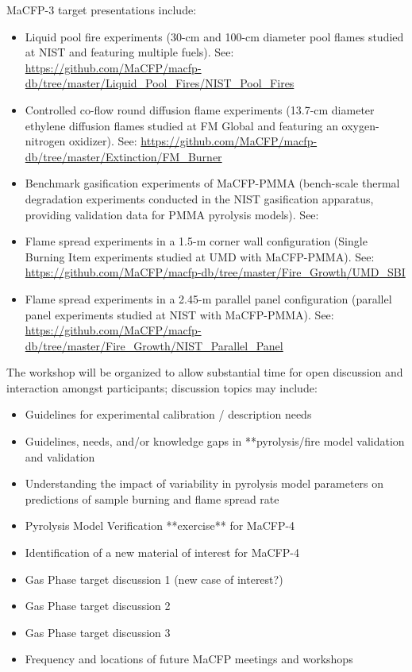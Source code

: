 \documentclass[12pt]{article}
\begin{document}
MaCFP-3 target presentations include:
\begin{itemize}[noitemsep]
\item Liquid pool fire experiments (30-cm and 100-cm diameter pool flames studied at NIST and featuring multiple fuels). See: \url{https://github.com/MaCFP/macfp-db/tree/master/Liquid_Pool_Fires/NIST_Pool_Fires}
\item Controlled co-flow round diffusion flame experiments (13.7-cm diameter ethylene diffusion flames studied at FM Global and featuring an oxygen-nitrogen oxidizer). See: \url{https://github.com/MaCFP/macfp-db/tree/master/Extinction/FM_Burner}
\item Benchmark gasification experiments of MaCFP-PMMA (bench-scale thermal degradation experiments conducted in the NIST gasification apparatus, providing validation data for PMMA pyrolysis models). See: %
\item Flame spread experiments in a 1.5-m corner wall configuration (Single Burning Item experiments studied at UMD with MaCFP-PMMA). See: \url{https://github.com/MaCFP/macfp-db/tree/master/Fire_Growth/UMD_SBI} 
\item Flame spread experiments in a 2.45-m parallel panel configuration (parallel panel experiments studied at NIST with MaCFP-PMMA). See: \url{https://github.com/MaCFP/macfp-db/tree/master/Fire_Growth/NIST_Parallel_Panel}
 \end{itemize}
 
\newpage
The workshop will be organized to allow substantial time for open discussion and interaction amongst participants; discussion topics may include:

\begin{itemize}[noitemsep]
\item Guidelines for experimental calibration / description needs
\item Guidelines, needs, and/or knowledge gaps in **pyrolysis/fire model validation and validation
\item Understanding the impact of variability in pyrolysis model parameters on predictions of sample burning and flame spread rate
\item Pyrolysis Model Verification **exercise** for MaCFP-4
\item Identification of a new material of interest for MaCFP-4
\item Gas Phase target discussion 1 (new case of interest?)
\item Gas Phase target discussion 2
\item Gas Phase target discussion 3
\item Frequency and locations of future MaCFP meetings and workshops
\end{itemize}
\clearpage
\end{document}
